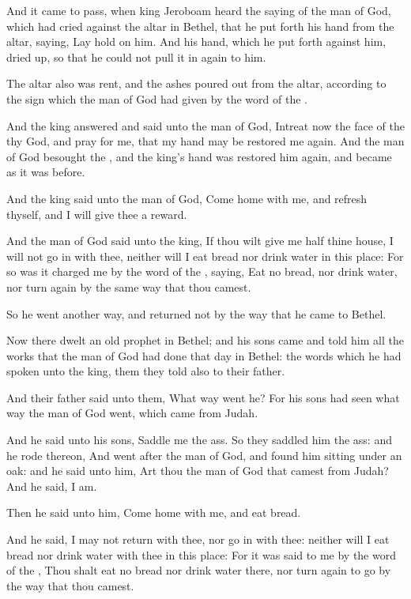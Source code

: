 \verse And it came to pass, when king Jeroboam heard the saying of the man of God, which had cried against the altar in Bethel, that he put forth his hand from the altar, saying, Lay hold on him. And his hand, which he put forth against him, dried up, so that he could not pull it in again to him.

\verse The altar also was rent, and the ashes poured out from the altar, according to the sign which the man of God had given by the word of the \LORD.

\verse And the king answered and said unto the man of God, Intreat now the face of the \LORD thy God, and pray for me, that my hand may be restored me again. And the man of God besought the \LORD, and the king's hand was restored him again, and became as it was before.

\verse And the king said unto the man of God, Come home with me, and refresh thyself, and I will give thee a reward.

\verse And the man of God said unto the king, If thou wilt give me half thine house, I will not go in with thee, neither will I eat bread nor drink water in this place: \verse For so was it charged me by the word of the \LORD, saying, Eat no bread, nor drink water, nor turn again by the same way that thou camest.

\verse So he went another way, and returned not by the way that he came to Bethel.

\verse Now there dwelt an old prophet in Bethel; and his sons came and told him all the works that the man of God had done that day in Bethel: the words which he had spoken unto the king, them they told also to their father.

\verse And their father said unto them, What way went he? For his sons had seen what way the man of God went, which came from Judah.

\verse And he said unto his sons, Saddle me the ass. So they saddled him the ass: and he rode thereon, \verse And went after the man of God, and found him sitting under an oak: and he said unto him, Art thou the man of God that camest from Judah? And he said, I am.

\verse Then he said unto him, Come home with me, and eat bread.

\verse And he said, I may not return with thee, nor go in with thee: neither will I eat bread nor drink water with thee in this place: \verse For it was said to me by the word of the \LORD, Thou shalt eat no bread nor drink water there, nor turn again to go by the way that thou camest.

